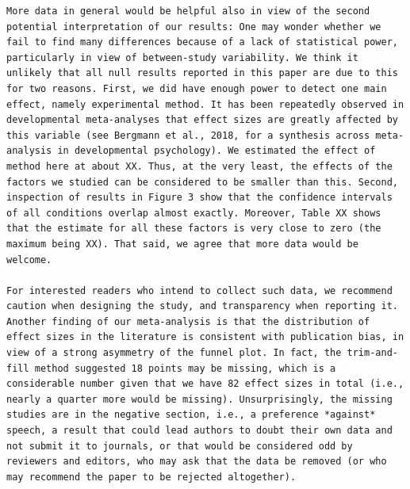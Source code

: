 \documentclass[]{apa6}
\begin{document}
\begin{verbatim}
More data in general would be helpful also in view of the second potential interpretation of our results: One may wonder whether we fail to find many differences because of a lack of statistical power, particularly in view of between-study variability. We think it unlikely that all null results reported in this paper are due to this for two reasons. First, we did have enough power to detect one main effect, namely experimental method. It has been repeatedly observed in developmental meta-analyses that effect sizes are greatly affected by this variable (see Bergmann et al., 2018, for a synthesis across meta-analysis in developmental psychology). We estimated the effect of method here at about XX. Thus, at the very least, the effects of the factors we studied can be considered to be smaller than this. Second, inspection of results in Figure 3 show that the confidence intervals of all conditions overlap almost exactly. Moreover, Table XX shows that the estimate for all these factors is very close to zero (the maximum being XX). That said, we agree that more data would be welcome.

For interested readers who intend to collect such data, we recommend caution when designing the study, and transparency when reporting it. Another finding of our meta-analysis is that the distribution of effect sizes in the literature is consistent with publication bias, in view of a strong asymmetry of the funnel plot. In fact, the trim-and-fill method suggested 18 points may be missing, which is a considerable number given that we have 82 effect sizes in total (i.e., nearly a quarter more would be missing). Unsurprisingly, the missing studies are in the negative section, i.e., a preference *against* speech, a result that could lead authors to doubt their own data and not submit it to journals, or that would be considered odd by reviewers and editors, who may ask that the data be removed (or who may recommend the paper to be rejected altogether). 


\end{verbatim}
\end{document}
